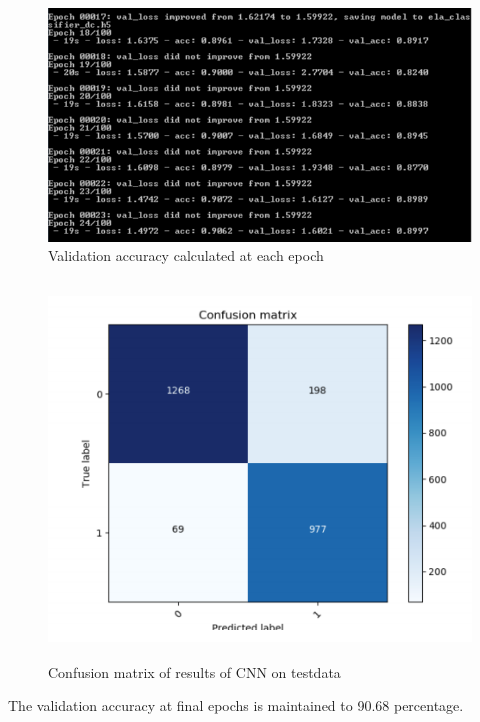 \begin{figure}[htp]
\centering
\includegraphics[width=14cm]{Figures/train2.PNG}
\caption{Validation accuracy calculated at each epoch}
\label{fig:lion}
\end{figure}
\newpage
\bigskip
\begin{figure}[htp]
\centering
\includegraphics[width=15cm,height=10cm]{Figures/matrix.PNG}
\caption{Confusion matrix of results of CNN on testdata}
\label{fig:lion}
\end{figure}

The validation accuracy at final epochs is maintained to 90.68 percentage.

